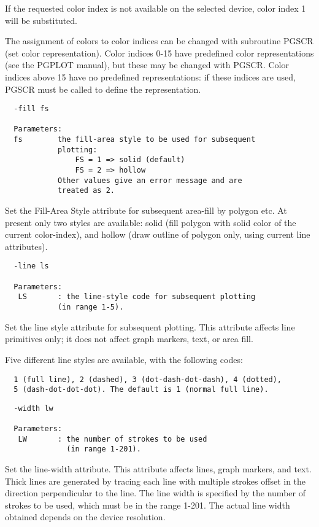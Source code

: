If the requested color index is not available on the selected device,
color index 1 will be substituted.

The assignment of colors to color indices can be changed with
subroutine PGSCR (set color representation).  Color indices 0-15
have predefined color representations (see the PGPLOT manual), but
these may be changed with PGSCR.  Color indices above 15  have no
predefined representations: if these indices are used, PGSCR must
be called to define the representation.


\begin{verbatim}
  -fill fs

  Parameters:
  fs        the fill-area style to be used for subsequent
            plotting:
                FS = 1 => solid (default)
                FS = 2 => hollow
            Other values give an error message and are
            treated as 2.
\end{verbatim}
Set the Fill-Area Style attribute for subsequent area-fill by
polygon etc.  At present only two styles are available: solid (fill
polygon with solid color of the current color-index), and hollow
(draw outline of polygon only, using current line attributes).

\begin{verbatim}
  -line ls

  Parameters:
   LS       : the line-style code for subsequent plotting
            (in range 1-5).
\end{verbatim}
Set the line style attribute for subsequent plotting. This
attribute affects line primitives only; it does not affect graph
markers, text, or area fill.

Five different line styles are available, with the following codes:
\begin{verbatim}
  1 (full line), 2 (dashed), 3 (dot-dash-dot-dash), 4 (dotted),
  5 (dash-dot-dot-dot). The default is 1 (normal full line).
\end{verbatim}

\begin{verbatim}
  -width lw

  Parameters:
   LW       : the number of strokes to be used
              (in range 1-201).
\end{verbatim}
Set the line-width attribute. This attribute affects lines, graph
markers, and text. Thick lines are generated by tracing each line
with multiple strokes offset in the direction perpendicular to the
line. The line width is specified by the number of strokes to be
used, which must be in the range 1-201. The actual line width
obtained depends on the device resolution.

